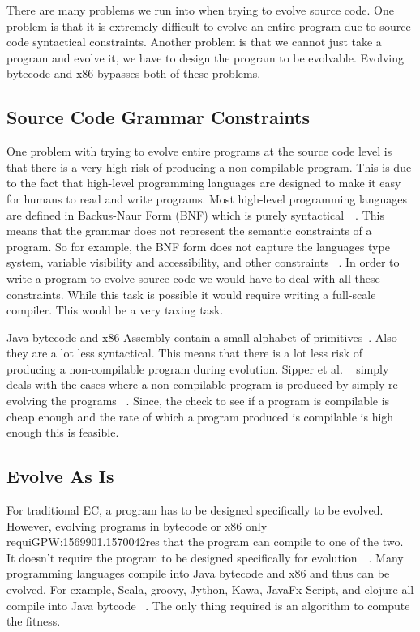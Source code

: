 \documentclass{sig-alternate}
\begin{document}
There are many problems we run into when trying to evolve source code. One problem is that it is extremely difficult to evolve an entire program due to source code syntactical constraints. Another problem is that we cannot just take a program and evolve it, we have to design the program to be evolvable. Evolving bytecode and x86 bypasses both of these problems.


\subsection{Source Code Grammar Constraints}
One problem with trying to evolve entire programs at the source code level is that there is a very high risk of producing a non-compilable program. This is due to the fact that high-level programming languages are designed to make it easy for humans to read and write programs. Most high-level programming languages are defined in Backus-Naur Form (BNF) which is purely syntactical~\cite{BNF:2014}~\cite{FINCH:2010}. This means that the grammar does not represent the semantic constraints of a program. So for example, the BNF form does not capture the languages type system, variable visibility and accessibility, and other constraints ~\cite{FINCH:2010}. In order to write a program to evolve source code we would have to deal with all these constraints. While this task is possible it would require writing a full-scale compiler. This would be a very taxing task. \par

Java bytecode and x86 Assembly contain a small alphabet of primitives~\cite{Assembly:2010}. Also they are a lot less syntactical. This means that there is a lot less risk of producing a non-compilable program during evolution. Sipper et al. ~\cite{FINCH:2010} simply deals with the cases where a non-compilable program is produced by simply re-evolving the programs ~\cite{FINCH:2010}. Since, the check to see if a program is compilable is cheap enough and the rate of which a program produced is compilable is high enough this is feasible. 

\subsection{Evolve As Is}
For traditional EC, a program has to be designed specifically to be evolved. However, evolving programs in bytecode or x86 only requiGPW:1569901.1570042res that the program can compile to one of the two. It doesn't require the program to be designed specifically for evolution~\cite{Assembly:2010}~\cite{FINCH:2010}. Many programming languages compile into Java bytecode and x86 and thus can be evolved. For example, Scala, groovy, Jython, Kawa, JavaFx Script, and clojure all compile into Java bytcode ~\cite{FINCH:2010}. The only thing required is an algorithm to compute the fitness. 
\end{document}
